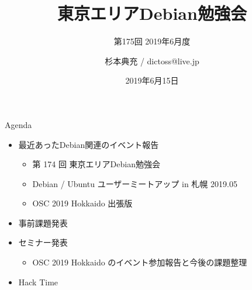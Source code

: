 \title{東京エリアDebian勉強会}
\subtitle{第175回 2019年6月度}
\author{杉本典充 / dictoss@live.jp}
\date{2019年6月15日}



\begin{frame}
\titlepage{}
\end{frame}

\begin{frame}{Agenda}
 \begin{minipage}[t]{0.45\hsize}
  \begin{itemize}
  \item 最近あったDebian関連のイベント報告
    \begin{itemize}
    \item 第 174 回 東京エリアDebian勉強会
    \item Debian / Ubuntu ユーザーミートアップ in 札幌 2019.05
    \item OSC 2019 Hokkaido 出張版
    \end{itemize}
  \item 事前課題発表
  \end{itemize}
 \end{minipage}
 \begin{minipage}[t]{0.45\hsize}
  \begin{itemize}
  \item セミナー発表
    \begin{itemize}
    \item OSC 2019 Hokkaido のイベント参加報告と今後の課題整理
    \end{itemize}
  \item Hack Time
  \end{itemize}
 \end{minipage}
\end{frame}

